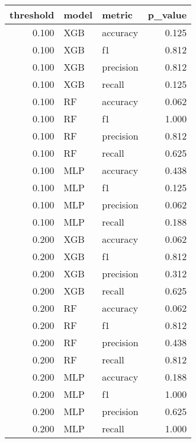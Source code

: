\begin{tabular}{rllr}
\toprule
threshold & model & metric & p_value \\
\midrule
0.100 & XGB & accuracy & 0.125 \\
0.100 & XGB & f1 & 0.812 \\
0.100 & XGB & precision & 0.812 \\
0.100 & XGB & recall & 0.125 \\
0.100 & RF & accuracy & 0.062 \\
0.100 & RF & f1 & 1.000 \\
0.100 & RF & precision & 0.812 \\
0.100 & RF & recall & 0.625 \\
0.100 & MLP & accuracy & 0.438 \\
0.100 & MLP & f1 & 0.125 \\
0.100 & MLP & precision & 0.062 \\
0.100 & MLP & recall & 0.188 \\
0.200 & XGB & accuracy & 0.062 \\
0.200 & XGB & f1 & 0.812 \\
0.200 & XGB & precision & 0.312 \\
0.200 & XGB & recall & 0.625 \\
0.200 & RF & accuracy & 0.062 \\
0.200 & RF & f1 & 0.812 \\
0.200 & RF & precision & 0.438 \\
0.200 & RF & recall & 0.812 \\
0.200 & MLP & accuracy & 0.188 \\
0.200 & MLP & f1 & 1.000 \\
0.200 & MLP & precision & 0.625 \\
0.200 & MLP & recall & 1.000 \\
\bottomrule
\end{tabular}
